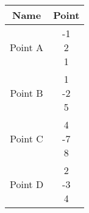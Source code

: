 \begin{tabular}[12pt]{ |c| c|}
    \hline
    \textbf{Name} & \textbf{Point}\\ 
    \hline
	Point A &\myvec{-1 \\ 2 \\ 1}\\
    \hline 
 Point B &\myvec{1 \\ -2 \\ 5}\\
    \hline
	  Point C &\myvec{4 \\ -7 \\ 8}\\
    \hline
    Point D &\myvec{2 \\ -3 \\ 4}\\
    \hline
    \end{tabular}
